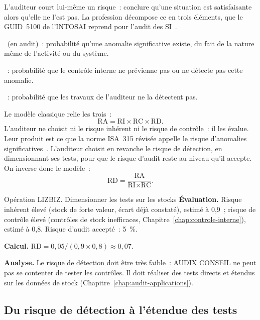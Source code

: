 L'auditeur court lui-même un risque~: conclure qu'une situation est
satisfaisante alors qu'elle ne l'est pas. La profession décompose ce
 en trois éléments, que le
GUID~5100 de l'INTOSAI reprend pour l'audit des SI~\cite{intosai2019guid5100}.

\begin{boxdef}
~(en audit)~: probabilité qu'une anomalie
significative existe, du fait de la nature même de l'activité ou du système.

\medskip
{}~: probabilité que le
contrôle interne ne prévienne pas ou ne détecte pas cette anomalie.

\medskip
{}~: probabilité que
les travaux de l'auditeur ne la détectent pas.
\end{boxdef}

Le modèle classique relie les trois~:
\[
    \text{RA} = \text{RI} \times \text{RC} \times \text{RD}.
\]
L'auditeur ne choisit ni le risque inhérent ni le risque de contrôle~: il
les évalue. Leur produit est ce que la norme ISA~315 révisée appelle le
risque d'anomalies significatives~\cite{iaasb2019isa315}. L'auditeur
choisit en revanche le risque de détection, en dimensionnant ses tests,
pour que le risque d'audit reste au niveau qu'il accepte. On inverse donc
le modèle~:
\[
    \text{RD} = \frac{\text{RA}}{\text{RI} \times \text{RC}}.
\]

\begin{boxscenario}{Opération LIZBIZ. Dimensionner les tests sur les stocks}
\textbf{Évaluation.} Risque inhérent élevé (stock de forte valeur, écart
déjà constaté), estimé à 0,9~; risque de contrôle élevé (contrôles de stock
inefficaces, Chapitre~\ref{chap:controle-interne}), estimé à 0,8. Risque
d'audit accepté~: 5~\%.

\medskip
\textbf{Calcul.} $\text{RD} = 0{,}05 / (0{,}9 \times 0{,}8) \approx 0{,}07$.

\medskip
\textbf{Analyse.} Le risque de détection doit être très faible~: AUDIX
CONSEIL ne peut pas se contenter de tester les contrôles. Il doit réaliser
des tests directs et étendus sur les données de stock
(Chapitre~\ref{chap:audit-applications}).
\end{boxscenario}

\subsection{Du risque de détection à l'étendue des tests}

